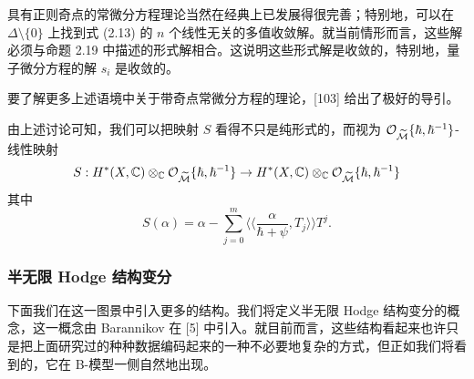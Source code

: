 具有正则奇点的常微分方程理论当然在经典上已发展得很完善；特别地，可以在 $\Delta\setminus\{0\}$ 上找到式 (2.13) 的 $n$ 个线性无关的多值收敛解。就当前情形而言，这些解必须与命题 2.19 中描述的形式解相合。这说明这些形式解是收敛的，特别地，量子微分方程的解 $s_i$ 是收敛的。


要了解更多上述语境中关于带奇点常微分方程的理论，[103] 给出了极好的导引。

由上述讨论可知，我们可以把映射 $S$ 看得不只是纯形式的，而视为 $\mathcal{O}_{\widetilde{\mathcal{M}}}\{\hbar,\hbar^{-1}\}$-线性映射
\[
S:H^*(X,\mathbb{C})\otimes_{\mathbb{C}}\mathcal{O}_{\widetilde{\mathcal{M}}}\{\hbar,\hbar^{-1}\}\to H^*(X,\mathbb{C})\otimes_{\mathbb{C}}\mathcal{O}_{\widetilde{\mathcal{M}}}\{\hbar,\hbar^{-1}\}
\]
其中
\[
S(\alpha)=\alpha-\sum_{j=0}^m\Big\langle\Big\langle\frac{\alpha}{\hbar+\psi},T_j\Big\rangle\Big\rangle T^j.
\]

\subsubsection{半无限 Hodge 结构变分}

下面我们在这一图景中引入更多的结构。我们将定义半无限 Hodge 结构变分的概念，这一概念由 Barannikov 在 [5] 中引入。就目前而言，这些结构看起来也许只是把上面研究过的种种数据编码起来的一种不必要地复杂的方式，但正如我们将看到的，它在 B-模型一侧自然地出现。


